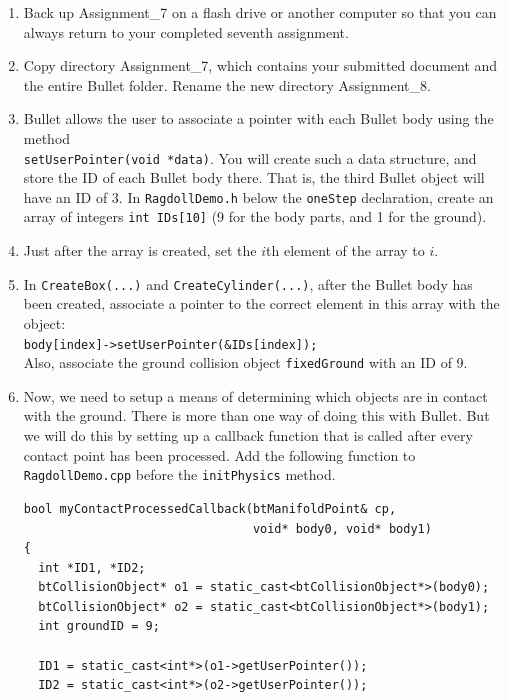\documentclass[12pt]{article}
\begin{document}
\begin{enumerate}

\item Back up Assignment\_7 on a flash drive or another computer so that you can always return to your completed seventh assignment.

\item Copy directory Assignment\_7, which contains your submitted document and the entire Bullet folder. Rename the new directory Assignment\_8.

\item Bullet allows the user to associate a pointer with each Bullet body using the method \\ \texttt{setUserPointer(void *data)}. You will create such a data structure, and store the ID of each Bullet body there. That is, the third Bullet object will have an ID of 3. In \verb|RagdollDemo.h| below the \verb|oneStep| declaration, create an array of integers \texttt{int IDs[10]} (9 for the body parts, and 1 for the ground).

\item Just after the array is created, set the $i$th element of the array to $i$.

\item In \texttt{CreateBox(...)} and \texttt{CreateCylinder(...)}, after the Bullet body has been created, associate a pointer to the correct element in this array with the object: \\
    \texttt{body[index]->setUserPointer(\&IDs[index]);}\\
Also, associate the ground collision object \verb|fixedGround| with an ID of 9.  

\item Now, we need to setup a means of determining which objects are in contact with the ground.  There is more than one way of doing this with Bullet.  But we will do this by setting up a callback function that is called after every contact point has been processed.  Add the following function to \verb|RagdollDemo.cpp| before the \verb|initPhysics| method.

\begin{verbatim}
bool myContactProcessedCallback(btManifoldPoint& cp,
                                void* body0, void* body1)
{
  int *ID1, *ID2;
  btCollisionObject* o1 = static_cast<btCollisionObject*>(body0);
  btCollisionObject* o2 = static_cast<btCollisionObject*>(body1);
  int groundID = 9;

  ID1 = static_cast<int*>(o1->getUserPointer());
  ID2 = static_cast<int*>(o2->getUserPointer());


\end{verbatim}
\end{enumerate}
\end{document}
